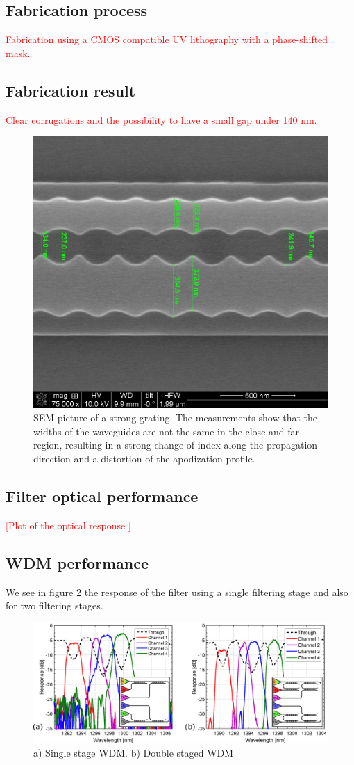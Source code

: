 \documentclass[letterpaper,10pt]{article}
\newcommand\todo[1]{\textcolor{red}{#1}}
\begin{document}
\subsection{Fabrication process}
\todo{Fabrication using a CMOS compatible UV lithography with a phase-shifted mask.}

\subsection{Fabrication result}
\todo{Clear corrugations and the possibility to have a small gap under 140 nm.}
\begin{figure}[htbp]
	\centering
	\includegraphics[width=.60\columnwidth]{1310_P36_g190maybe}
	\caption{SEM picture of a strong grating. The measurements show that the widths of the waveguides are not the same in the close and far region, resulting in a strong change of index along the propagation direction and a distortion of the apodization profile. }
	\label{fig:litho}
\end{figure}

\subsection{Filter optical performance}
\todo{[Plot of the optical response ]}

\subsection{WDM performance}
We see in figure \ref{fig:WDM} the response of the filter using a single filtering stage and also for two filtering stages.
\begin{figure}[htbp]
	\centering
	\includegraphics[width=.99\columnwidth]{WDM}
	\caption{a) Single stage WDM. b) Double staged WDM }
	\label{fig:WDM}
\end{figure}
\end{document}

